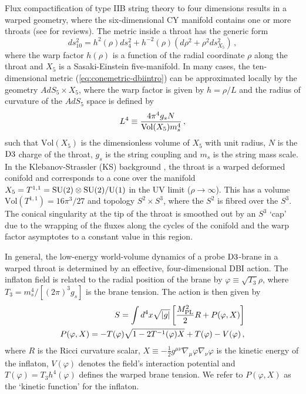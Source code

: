 Flux compactification of type IIB string theory to four dimensions 
results in a warped geometry, where the six-dimensional CY  
manifold contains one or more throats (see \cite{grana,douglas} for reviews). 
The metric inside a throat has the generic form
% 
\begin{equation}
\label{eq:conemetric-dbiintro}
ds_{10}^2= h^2 ( \rho) ds_4^2 + h^{-2} (\rho ) 
\left( d\rho^2 +\rho^2 ds_{X_5}^2 \right) \,,
\end{equation}
%  
where the warp factor $h (\rho)$ is a function of the 
radial coordinate $\rho$ along the throat and $X_5$
is a Sasaki-Einstein five-manifold. 
In many cases, the ten-dimensional metric (\ref{eq:conemetric-dbiintro}) can be 
approximated locally by the geometry $AdS_5 \times X_5$, where the 
warp factor is given by $h=\rho /L$ and 
the radius of curvature of the $AdS_5$ space is defined by
%  
\begin{equation}
L^4 \equiv \frac{4\pi^4 g_s N}{{\rm Vol} (X_5) m_s^4} \,,
\end{equation}
% 
such that $\mathrm{Vol}(X_5)$ is the dimensionless volume of 
$X_5$ with unit radius, $N$ is the ${\rm D3}$  charge of the throat, 
$g_s$ is the string coupling and $m_s$ is the string mass scale.
In the Klebanov-Strassler (KS) background \cite{ks}, the throat 
is a warped deformed conifold and 
corresponds to a cone over the manifold 
$X_5 = T^{1,1}= {\rm SU(2)} \otimes {\rm SU(2)}/{\rm U(1)}$
in the UV limit ($\rho \rightarrow \infty$). This has   
a volume $\mathrm{Vol} (T^{1,1}) = 16\pi^3/27$ and  topology
$S^2\times S^3$, where the $S^2$ is fibred over the $S^3$.
The conical singularity at the tip of the throat 
is smoothed out by an 
$S^3$ `cap' due to the wrapping of the fluxes along the cycles of the conifold
\cite{ks,kt} and the warp factor asymptotes to 
a constant value in this region.   
 

In general, the low-energy world-volume dynamics
of a probe ${\rm D3}$-brane in a warped throat is determined 
by an effective, four-dimensional DBI action. 
The inflaton field is related to the radial 
position of the brane by 
$\varphi \equiv \sqrt{T_3} \rho$, where $T_3 =m_s^4/[(2\pi )^3 g_s ]$ 
is the brane tension. The action is then given by 
% 
\begin{eqnarray}
\label{eq:DBIaction-dbiintro}
S=\int  d^4x \sqrt{|g|} \left[ \frac{M_{\mathrm{PL}}^2}{2} R 
+ P (\varphi , X) \right] \\
\label{defP}
P( \varphi ,X) = - T (\varphi)  \sqrt{1 - 2T^{-1} (\varphi ) X}
+T (\varphi)  -V(\varphi)  \,,
\end{eqnarray}
% 
where $R$ is the Ricci curvature scalar,
$X \equiv - \frac{1}{2} g^{\mu\nu} \nabla_{\mu} \varphi \nabla_{\nu} \varphi$
is the kinetic energy of the inflaton, $V(\varphi )$ denotes 
the field's interaction 
potential and $T(\varphi ) = T_3 h^4 (\varphi )$
defines the warped brane tension. We refer to $P(\varphi , X)$ as the 
`kinetic function' for the inflaton. 
 

